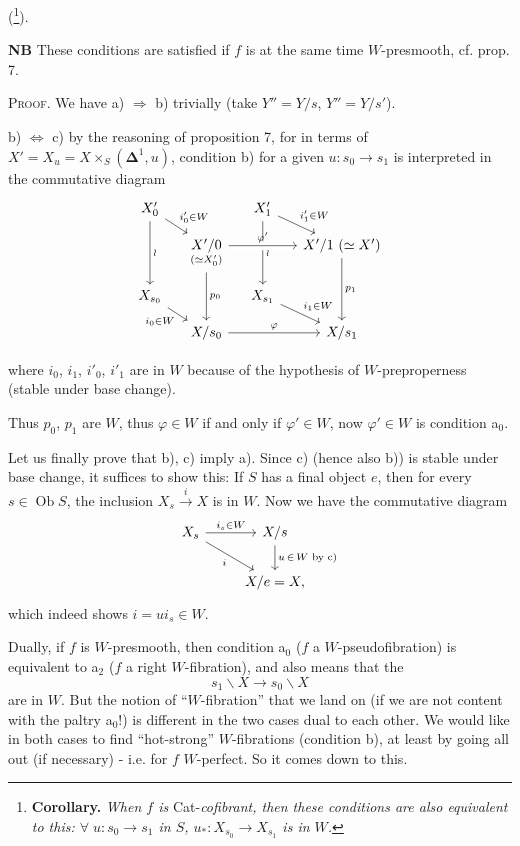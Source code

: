 \documentclass[11pt,leqno]{article}
\newcommand{\printedpage}[1]{\marginpar{\footnotesize p.~#1}}
\newcommand{\msp}[1]{\marginpar{\footnotesize [#1]}}
\newcommand{\fl}{\longrightarrow}
\newcommand{\Ob}{\operatorname{Ob}}
\begin{document}
(\footnote[49]{\textbf{Corollary.} \textit{When $f$ is} Cat-\textit{cofibrant, then these conditions are also equivalent to this: $\forall\; u : s_0\fl s_1$ in $S$, $u_* : X_{s_0}\fl X_{s_1}$ is in $W$.}}).

\printedpage{31}
\textbf{NB} These conditions are satisfied if $f$ is at the same time $W$-presmooth, cf. prop. 7.

\textsc{Proof}. We have a) $\Longrightarrow$ b) trivially (take $Y''=Y/s$, $Y''=Y/s'$).

b) $\Longleftrightarrow$ c) by the reasoning of proposition 7, for in terms of $X'=X_u=X\times_S(\boldsymbol{\Delta}^1,u)$, condition b) for a given $u : s_0\fl s_1$ is interpreted in the commutative diagram
\[
\begin{tikzcd}[column sep=small, row sep=small]
X'_0 \arrow[dr, "i'_0\in W"] \arrow[dd, "\wr"] & & X'_1 \arrow[dr, "i'_1\in W"] \arrow[dd, "\wr"] & \\
 & \underset{(\simeq X'_0)}{X'/0} \arrow[rr, "\varphi'", crossing over] \arrow[dd, "p_0"] & & X'/1\ (\simeq X') \arrow[dd, "p_1"] \\
X_{s_0} \arrow[dr, "i_0\in W"'] & & X_{s_1} \arrow[dr, "i_1\in W"] & \\
 & X/s_0 \arrow[rr, "\varphi"] & & X/s_1
\end{tikzcd}
\]

 where $i_0$, $i_1$, $i'_0$, $i'_1$ are in $W$ because of the hypothesis of $W$-preproperness (stable under base change).

Thus $p_0$, $p_1$ are $W$, thus $\varphi\in W$ if and only if $\varphi'\in W$, now $\varphi'\in W$ is condition a$_0$.

\msp{page 42}Let us finally prove that b), c) imply a). Since c) (hence also b)) is stable under base change, it suffices to show this: If $S$ has a final object $e$, then for every $s\in\Ob S$, the inclusion $X_s\xrightarrow{\ i\ }X$ is in $W$. Now we have the commutative diagram
\[
\begin{tikzcd}
X_s \arrow[r, "i_s\in W"] \arrow[dr, "i"'] & X/s \arrow[d, "u\,\in\,W\text{ by c) }"] \\
 & X/e=X,
\end{tikzcd}
\]
which indeed shows $i=ui_s\in W$.

Dually, if $f$ is $W$-presmooth, then condition a$_0$ ($f$ a $W$-pseudofibration) is equivalent to a$_2$ ($f$ a right $W$-fibration), and also means that the
\[ s_1\backslash X\fl s_0\backslash X \]
are in $W$. But the notion of ``$W$-fibration'' that we land on (if we are not content with the paltry a$_0$!) is different in the two cases dual to each other. We would like in both cases to find ``hot-strong'' $W$-fibrations (condition b), at least by going all out (if necessary) - i.e. for $f$ $W$-perfect. So it comes down to this.
\end{document}
